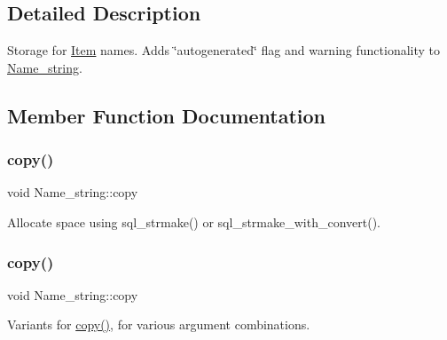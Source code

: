 \subsection{Detailed Description}
Storage for \mbox{\hyperlink{classItem}{Item}} names. Adds \char`\"{}autogenerated\char`\"{} flag and warning functionality to \mbox{\hyperlink{className__string}{Name\+\_\+string}}. 

\subsection{Member Function Documentation}
\mbox{\label{classItem__name__string_ad2f16ca58a7fd5438005f065d6daf345}} 
\subsubsection{\texorpdfstring{copy()}{copy()}\hspace{0.1cm}{\footnotesize\ttfamily [1/3]}}
{\footnotesize\ttfamily void Name\+\_\+string\+::copy}

Allocate space using sql\+\_\+strmake() or sql\+\_\+strmake\+\_\+with\+\_\+convert(). \mbox{\label{classItem__name__string_a9e0c169b1a92030ea8b43ab76984c604}} 
\subsubsection{\texorpdfstring{copy()}{copy()}\hspace{0.1cm}{\footnotesize\ttfamily [2/3]}}
{\footnotesize\ttfamily void Name\+\_\+string\+::copy\hspace{0.3cm}{\ttfamily [inline]}}

Variants for \mbox{\hyperlink{classItem__name__string_a41f16804fbc5f43c4aa334fe422bdd94}{copy()}}, for various argument combinations. \mbox{\label{classItem__name__string_a41f16804fbc5f43c4aa334fe422bdd94}} 

